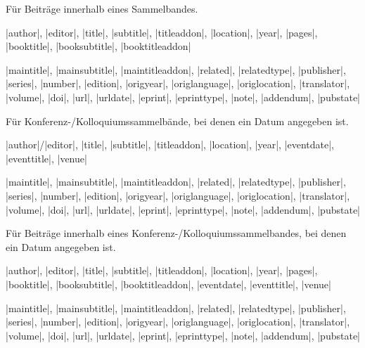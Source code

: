 \documentclass[a4paper,10pt,ngerman]{ltxdoc}
\begin{document}

 
    Für Beiträge innerhalb eines Sammelbandes.
\begin{description}[topsep=0pt]
\item[Notwendig:] |author|, |editor|, |title|, |subtitle|, |titleaddon|, |location|, |year|, |pages|, |booktitle|, |booksubtitle|, |booktitleaddon|
\item[Optional:] |maintitle|, |mainsubtitle|, |maintitleaddon|, |related|, |relatedtype|, |publisher|, |series|, |number|, |edition|, |origyear|, |origlanguage|, |origlocation|, |translator|, |volume|, |doi|, |url|, |urldate|, |eprint|, |eprinttype|, |note|, |addendum|, |pubstate|
\end{description}


 
  Für Konferenz-/Kolloquiumssammelbände, bei denen ein Datum angegeben ist. 
\begin{description}[topsep=0pt]
\item[Notwendig:] |author|/|editor|, |title|, |subtitle|, |titleaddon|, |location|, |year|, |eventdate|, |eventtitle|, |venue|
\item[Optional:] |maintitle|, |mainsubtitle|, |maintitleaddon|, |related|, |relatedtype|, |publisher|, |series|, |number|, |edition|, |origyear|, |origlanguage|, |origlocation|, |translator|, |volume|, |doi|, |url|, |urldate|, |eprint|, |eprinttype|, |note|, |addendum|, |pubstate|
\end{description}



  Für Beiträge innerhalb eines Konferenz-/Kolloquiumssammelbandes, bei denen ein Datum angegeben ist. 
\begin{description}[topsep=0pt]
\item[Notwendig:] |author|, |editor|, |title|, |subtitle|, |titleaddon|, |location|, |year|, |pages|, |booktitle|, |booksubtitle|, |booktitleaddon|, |eventdate|, |eventtitle|, |venue|
\item[Optional:] |maintitle|, |mainsubtitle|, |maintitleaddon|, |related|, |relatedtype|, |publisher|, |series|, |number|, |edition|, |origyear|, |origlanguage|, |origlocation|, |translator|, |volume|, |doi|, |url|, |urldate|, |eprint|, |eprinttype|, |note|, |addendum|, |pubstate|
\end{description}
\end{document}
